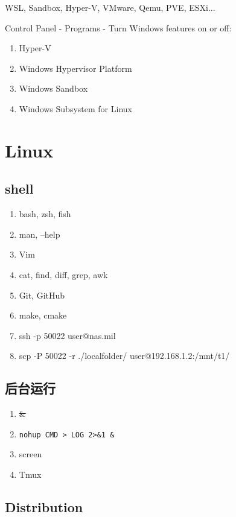 \documentclass[a4paper]{article}
\begin{document}
WSL, Sandbox, Hyper-V, VMware, Qemu, PVE, ESXi...

Control Panel - Programs - Turn Windows features on or off:

\begin{enumerate}[leftmargin=2cm,  itemindent=1cm]
    \item Hyper-V
    \item Windows Hypervisor Platform
    \item Windows Sandbox
    \item Windows Subsystem for Linux
\end{enumerate}

\section{\LARGE Linux}

\subsection{\LARGE shell}

\begin{enumerate}[leftmargin=2cm,  itemindent=1cm]
    \item bash,  zsh,  fish
    \item man,  --help
    \item Vim
    \item cat,  find,  diff,  grep,  awk
    \item Git,  GitHub
    \item make,  cmake
    \tt
    \item ssh -p 50022 user@nas.mil
    \item scp -P 50022 -r ./localfolder/ user@192.168.1.2:/mnt/t1/
\end{enumerate}

\subsection{\LARGE 后台运行}

\begin{enumerate}[leftmargin=2cm,  itemindent=1cm]
    \item \sout{\&}
    \item {\tt nohup CMD > LOG 2>\&1 \&}
    \item screen
    \item Tmux
\end{enumerate}

\subsection{\LARGE Distribution}
\end{document}
